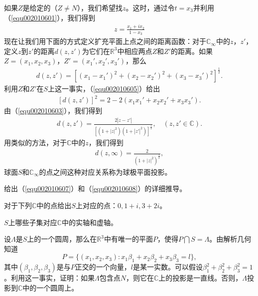 如果$Z$是给定的（$Z \neq N$），我们希望找$z$。这时，通过令$t = x_3$并利用（\ref{equ002010601}），我们得到
\begin{gather}\label{equ002010604}
z = \frac{x_1 + ix_2}{1 - x_3}
\end{gather}
现在让我们用下面的方式定义扩充平面上点之间的距离函数：对于$\mathbb{C}_{\infty}$中的$z$，$z'$，定义$z$到$z'$的距离$d(z,z')$为它们在$\mathbb{R}^3$中相应两点$Z$和$Z'$的距离。如果$Z=(x_1,x_2,x_3)$，$Z'=(x_1',x_2',x_3')$，那么
\begin{gather}\label{equ002010605}
d(z,z') = [(x_1-x_1')^2 + (x_2-x_2')^2 + (x_3-x_3')^2]^{\frac{1}{2}}.
\end{gather}
利用$Z$和$Z'$在$S$上这一事实，（\ref{equ002010605}）给出
\begin{gather}\label{equ002010606}
[d(z,z')]^2 = 2 - 2(x_1x_1' + x_2x_2'+x_3x_3').
\end{gather}
由（\ref{equ002010603}），我们得到
\begin{gather}\label{equ002010607}
d(z,z') = \frac{2|z-z'|}{[(1+|z|^2)(1+|z'|^2)]^{\frac{1}{2}}}, \quad (z,z' \in \mathbb{C}).
\end{gather}
用类似的方法，对于$\mathbb{C}$中的$z$，我们得到
\begin{gather}\label{equ002010608}
d(z, \infty) = \frac{2}{(1 + |z|^2)^{\frac{1}{2}}},
\end{gather}
球面$S$和$\mathbb{C}_{\infty}$的点之间这种对应关系称为球极平面投影。

\begin{exercise}
给出（\ref{equ002010607}）和（\ref{equ002010608}）的详细推导。
\end{exercise}

\begin{exercise}
对于下列$\mathbb{C}$中的点给出$S$上对应的点：$0, 1+i,3+2i$。
\end{exercise}

\begin{exercise}
$S$上哪些子集对应$\mathbb{C}$中的实轴和虚轴。
\end{exercise}

\begin{exercise}
设$\Lambda$是$S$上的一个圆周，那么在$\mathbb{R}^3$中有唯一的平面$P$，使得$P \bigcap S = \Lambda$。由解析几何知道
\[
P = \{(x_1,x_2,x_3):x_1\beta_1 + x_2\beta_2 + x_3\beta_3 = l\},
\]
其中$(\beta_1,\beta_2,\beta_3)$是与$P$正交的一个向量，$l$是某一实数。可以假设$\beta_1^2+\beta_2^2+\beta_3^2=1$。利用这一事实，证明：如果$\Lambda$包含点$N$，则它在$\mathbb{C}$上的投影是一直线。否则，$\Lambda$投影到$\mathbb{C}$中的一个圆周上。
\end{exercise}

